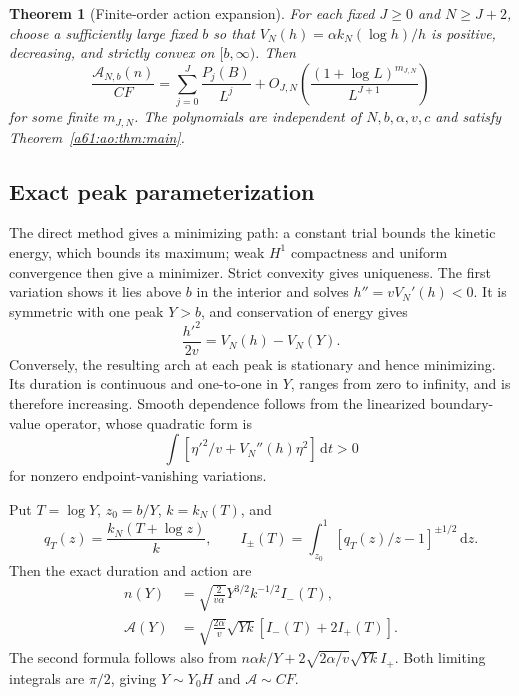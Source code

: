 \documentclass[11pt,letterpaper]{article}
\numberwithin{equation}{section}
\newtheorem{theorem}{Theorem}[section]
\theoremstyle{remark}\newtheorem{remark}[theorem]{Remark}
\newcommand{\A}{\mathcal A}
\newcommand{\dd}{\,\mathrm d}
\begin{document}
\begin{theorem}[Finite-order action expansion]\label{a61:ao:thm:action}
For each fixed $J\ge0$ and $N\ge J+2$, choose a sufficiently large
fixed $b$ so that $V_N(h)=\alpha k_N(\log h)/h$ is positive,
decreasing, and strictly convex on $[b,\infty)$. Then
\begin{equation}\label{a61:ao:eq:actionexpansion}
 \frac{\A_{N,b}(n)}{CF}
 =\sum_{j=0}^J\frac{P_j(B)}{L^j}
 +O_{J,N}\left(\frac{(1+\log L)^{m_{J,N}}}{L^{J+1}}\right)
\end{equation}
for some finite $m_{J,N}$. The polynomials are independent of
$N,b,\alpha,v,c$ and satisfy Theorem~\ref{a61:ao:thm:main}.
\end{theorem}

\subsection{Exact peak parameterization}
The direct method gives a minimizing path: a constant trial bounds the
kinetic energy, which bounds its maximum; weak $H^1$ compactness and
uniform convergence then give a minimizer. Strict convexity gives
uniqueness. The first variation shows it lies above $b$ in the
interior and solves $h''=vV_N'(h)<0$. It is symmetric with one peak
$Y>b$, and conservation of energy gives
\[
 \frac{h'^2}{2v}=V_N(h)-V_N(Y).
\]
Conversely, the resulting arch at each peak is stationary and hence
minimizing. Its duration is continuous and one-to-one in $Y$, ranges
from zero to infinity, and is therefore increasing. Smooth dependence
follows from the linearized boundary-value operator, whose quadratic
form is
\[
 \int[\eta'^2/v+V_N''(h)\eta^2]\dd t>0
\]
for nonzero endpoint-vanishing variations.

Put $T=\log Y$, $z_0=b/Y$, $k=k_N(T)$, and
\[
 q_T(z)=\frac{k_N(T+\log z)}k,\qquad
 I_\pm(T)=\int_{z_0}^1[q_T(z)/z-1]^{\pm1/2}\dd z.
\]
Then the exact duration and action are
\begin{align}
 n(Y)&=\sqrt{\frac2{v\alpha}}Y^{3/2}k^{-1/2}I_-(T),
 \label{a61:ao:eq:duration}\\
 \A(Y)&=\sqrt{\frac{2\alpha}v}\sqrt{Yk}
 [I_-(T)+2I_+(T)].\label{a61:ao:eq:peakaction}
\end{align}
The second formula follows also from
$n\alpha k/Y+2\sqrt{2\alpha/v}\sqrt{Yk}I_+$.
Both limiting integrals are $\pi/2$, giving
$Y\sim Y_0H$ and $\A\sim CF$.
\end{document}
